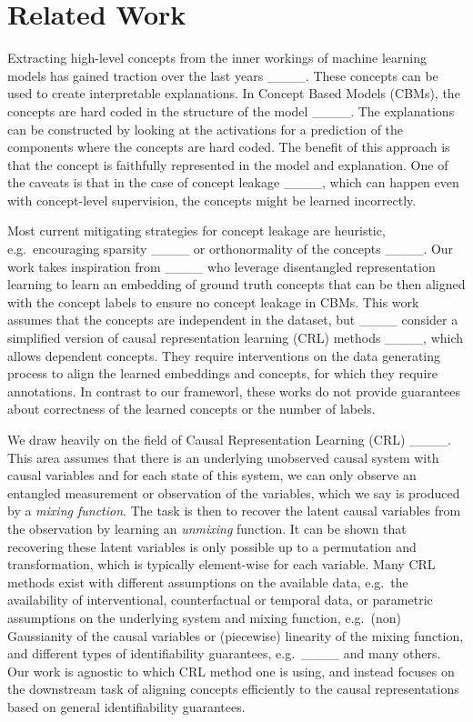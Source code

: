 \section{Related Work}
Extracting high-level concepts from the inner workings of machine learning
models has gained traction over the last years ____. These concepts can be used to
create interpretable explanations. In Concept Based Models (CBMs), the concepts
are hard coded in the structure of the model ____. The explanations
can be constructed by looking at the activations for a prediction of the
components where the concepts are hard coded. The benefit of this approach is
that the concept is faithfully represented in the model and explanation. One of
the caveats is that in the case of concept leakage
____,
which can happen even with concept-level supervision, the concepts might be
learned incorrectly. 

Most current mitigating strategies for concept leakage are heuristic, e.g.\
encouraging sparsity ____ or orthonormality of the
concepts ____. Our work takes inspiration from
____ who leverage disentangled representation learning to
learn an embedding of ground truth concepts that can be then aligned with the
concept labels to ensure no concept leakage in CBMs. This work assumes that the
concepts are  independent in the dataset, but
____ consider a simplified version of causal
representation learning (CRL) methods ____, which allows
dependent concepts. They require interventions on the data generating process
to align the learned embeddings and concepts, for which they require
annotations. In contrast to our frameworl, these works do not provide
guarantees about correctness of the learned concepts or the number of labels. 

We draw heavily on the field of Causal Representation Learning (CRL)
____. This area assumes that there is an underlying
unobserved causal system with causal variables and for each state of this
system, we can only observe an entangled measurement or observation of the
variables, which we say is produced by a \emph{mixing function}. The task is
then to recover the latent causal variables from the observation by learning an
\emph{unmixing} function. It can be shown that recovering these latent
variables is only possible up to a permutation and transformation, which is
typically element-wise for each variable. Many CRL methods exist with different
assumptions on the available data, e.g.\ the availability of interventional,
counterfactual or temporal data, or parametric assumptions on the underlying
system and mixing function, e.g.\ (non) Gaussianity of the causal variables or
(piecewise) linearity of the mixing function, and different types of
identifiability guarantees, e.g.\
____ and many others. Our work is
agnostic to which CRL method one is using, and instead focuses on the
downstream task of aligning concepts efficiently to the causal representations
based on general identifiability guarantees.